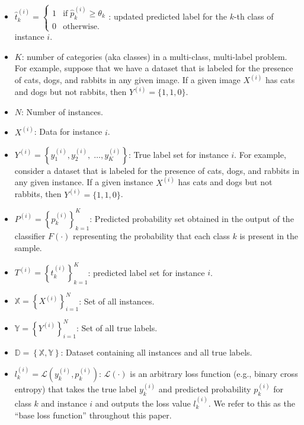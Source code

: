 \begin{itemize}
    \item  $\widehat{t}_k^{(i)}=\left\{\begin{array}{ll}1&\text{if}\;\widehat{p}_k^{(i)}\geq\theta_k\\0&\text{otherwise.}\end{array}\right. $: updated predicted label for the $k $-th class of instance $i $.
    \item $K $: number of categories (aka classes) in a multi-class, multi-label problem. For example, suppose that we have a dataset that is labeled for the presence of cats, dogs, and rabbits in any given image. If a given image $X^{(i)} $ has cats and dogs but not rabbits, then $Y^{(i)} = \{1,1,0\} $.
    \item  $N $: Number of instances.
    \item $X^{(i)} $: Data for instance $i$.
    \item     $Y^{(i)}=\left\{y_1^{(i)},y_2^{(i)},\;\dots,y_{K}^{(i)}\right\} $: True label set for instance $i $. For example, consider a dataset that is labeled for the presence of cats, dogs, and rabbits in any given instance. If a given instance $X^{(i)} $ has cats and dogs but not rabbits, then $Y^{(i)}=\{1,1,0\} $.
    \item     $P^{(i)} = {\left\{ p_k^{(i)} \right\}}_{k=1}^{K} $: Predicted probability set obtained in the output of the classifier $F(\cdot) $ representing the probability that each class $k $ is present in the sample.
    \item  $T^{(i)} = {\left\{t_k^{(i)}\right\}}_{k=1}^{K} $: predicted label set for instance $i $.
    \item  $\mathbb{X} = {\left\{X^{(i)}\right\}}_{i=1}^{N} $: Set of all instances.
    \item  $\mathbb{Y} = {\left\{Y^{(i)}\right\}}_{i=1}^{N} $: Set of all true labels.
    \item $\mathbb{D}=\left\{\mathbb{X},\mathbb{Y}\right\} $: Dataset containing all instances and all true labels.
    \item  $l_k^{(i)} = \mathcal{L} \left(y_k^{(i)},p_k^{(i)}\right) $:  $\mathcal{L}(\cdot)$ is an arbitrary loss function (e.g., binary cross entropy) that takes the true label $y_k^{(i)}$ and predicted probability $p_k^{(i)}$ for class $k$ and instance $i$ and outputs the loss value $l_k^{(i)} $. We refer to this as the ``base loss function'' throughout this paper.

\end{itemize}
